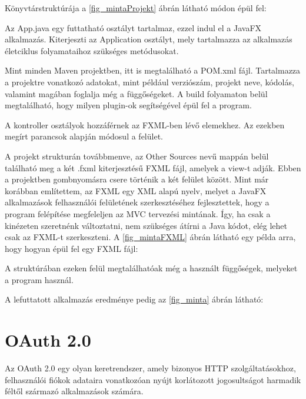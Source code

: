 Könyvtárstruktúrája a \ref{fig_mintaProjekt} ábrán látható módon épül fel: 



Az App.java egy futtatható osztályt tartalmaz, ezzel indul el a JavaFX alkalmazás.
Kiterjeszti az Application osztályt, mely tartalmazza az alkalmazás életciklus folyamataihoz szükséges metódusokat.

Mint minden Maven projektben, itt is megtalálható a POM.xml fájl.
Tartalmazza a projektre vonatkozó adatokat, mint például verziószám, projekt neve, kódolás, valamint magában foglalja még a függőségeket.
A build folyamaton belül megtalálható, hogy milyen plugin-ok segítségével épül fel a program. 

A kontroller osztályok hozzáférnek az FXML-ben lévő elemekhez.
Az ezekben megírt parancsok alapján módosul a felület. 

A projekt strukturán továbbmenve, az Other Sources nevű mappán belül található meg a két .fxml kiterjesztésű FXML fájl, amelyek a view-t adják.
Ebben a projektben gombnyomásra csere történik a két felület között.
Mint már korábban említettem, az FXML egy XML alapú nyelv, melyet a JavaFX alkalmazások felhasználói felületének szerkesztéséhez fejlesztettek, hogy a program felépítése megfeleljen az MVC tervezési mintának.
Így, ha csak a kinézeten szeretnénk változtatni, nem szükséges átírni a Java kódot, elég lehet csak az FXML-t szerkeszteni.
A \ref{fig_mintaFXML} ábrán látható egy példa arra, hogy hogyan épül fel egy FXML fájl: 


A struktúrában ezeken felül megtalálhatóak még a használt függőségek, melyeket a program használ. 

A lefuttatott alkalmazás eredménye pedig az \ref{fig_minta} ábrán látható:

%



\section{OAuth 2.0}

Az OAuth 2.0 egy olyan keretrendszer, amely bizonyos HTTP szolgáltatásokhoz, felhasználói fiókok adataira vonatkozóan nyújt korlátozott jogosultságot harmadik féltől származó alkalmazások számára. 

